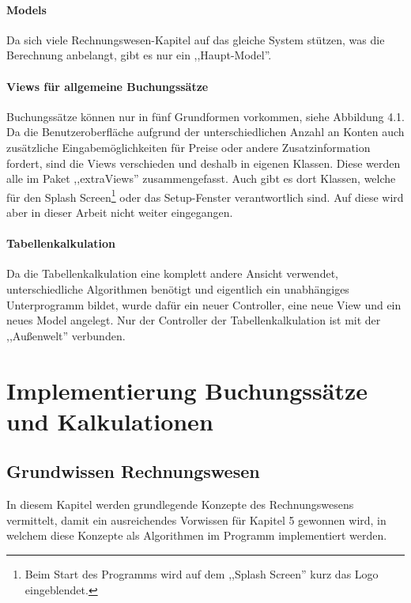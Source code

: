 \documentclass[12pt]{report}
\begin{document}
\subsection{Models}
Da sich viele Rechnungswesen-Kapitel auf das gleiche System stützen, was die Berechnung anbelangt, gibt es nur ein ,,Haupt-Model''.
  

  
\subsection{Views für allgemeine Buchungssätze}

Buchungssätze können nur in fünf Grundformen vorkommen, siehe Abbildung 4.1. Da die Benutzeroberfläche aufgrund der unterschiedlichen Anzahl an Konten auch zusätzliche Eingabemöglichkeiten für Preise oder andere Zusatzinformation fordert, sind die Views verschieden und deshalb in eigenen Klassen. 
Diese werden alle im Paket ,,extraViews'' zusammengefasst. Auch gibt es dort Klassen, welche für den Splash Screen\footnote{Beim Start des Programms wird auf dem ,,Splash Screen'' kurz das Logo eingeblendet.} oder das Setup-Fenster verantwortlich sind. Auf diese wird aber in dieser Arbeit nicht weiter eingegangen.

\subsection{Tabellenkalkulation}
Da die Tabellenkalkulation eine komplett andere Ansicht verwendet, unterschiedliche Algorithmen benötigt und eigentlich ein unabhängiges Unterprogramm bildet, wurde dafür ein neuer Controller, eine neue View und ein neues Model angelegt. Nur der Controller der Tabellenkalkulation ist mit der ,,Außenwelt'' verbunden.







 





\part{Implementierung Buchungssätze und Kalkulationen}
 
 
\chapter{Grundwissen Rechnungswesen}
In diesem Kapitel werden grundlegende Konzepte des Rechnungswesens vermittelt, damit ein ausreichendes Vorwissen für Kapitel 5 gewonnen wird, in welchem diese Konzepte als Algorithmen im Programm implementiert werden.
 
\end{document}
